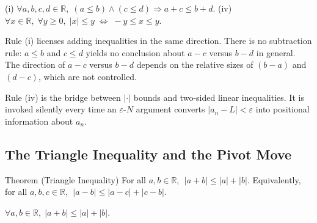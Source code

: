 \begin{remark*}
\end{remark*}


\begin{remark}
(i) $\forall a,b,c,d\in\mathbb{R},\;(a\leq b)\land(c\leq d)
    \Rightarrow a+c\leq b+d$. \quad
(iv) $\forall x\in\mathbb{R},\;\forall y\geq 0,\;
    |x|\leq y\;\Leftrightarrow\;-y\leq x\leq y$.
\end{remark}

\begin{remark}
Rule (i) licenses adding inequalities in the same direction. There is no
subtraction rule: $a\leq b$ and $c\leq d$ yields no conclusion about
$a-c$ versus $b-d$ in general. The direction of $a-c$ versus $b-d$ depends
on the relative sizes of $(b-a)$ and $(d-c)$, which are not controlled.
\end{remark}

\begin{remark}
Rule (iv) is the bridge between $|\cdot|$ bounds and two-sided linear
inequalities. It is invoked silently every time an $\varepsilon$-$N$ argument
converts $|a_n-L|<\varepsilon$ into positional information about $a_n$.
\end{remark}



\subsection*{The Triangle Inequality and the Pivot Move}
\label{subsec:triangle-ineq}

\begin{theorembox}{Theorem (Triangle Inequality)}
For all $a,b\in\mathbb{R}$, $\;|a+b|\leq|a|+|b|$. Equivalently, for all
$a,b,c\in\mathbb{R}$, $\;|a-b|\leq|a-c|+|c-b|$.
\end{theorembox}

\begin{remark}
$\forall a,b\in\mathbb{R},\;|a+b|\leq|a|+|b|$.
\end{remark}

